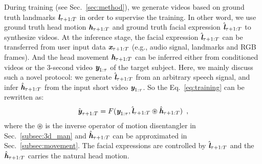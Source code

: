 \documentclass[runningheads]{llncs}
\def\mathbi#1{\textbf{\em #1}}
\begin{document}
During training (see Sec.~\ref{sec:method}), we generate videos based on ground truth landmarks $\mathbi{l}_{\tau+1:T}$ in order to supervise the training. In other word, we use ground truth head motion $\mathbi{h}_{\tau+1:T}$ and ground truth facial expression $\hat{\mathbi{l}}_{\tau+1:T}$ to synthesize videos. At the inference stage, the facial expression $\hat{\mathbi{l}}_{\tau+1:T}$ can be transferred from user input data ${\mathbi{x}}_{\tau+1:T}$ (e.g., audio signal, landmarks and RGB frames). And the head movement ${\mathbi{h}}_{\tau+1:T}$ can be inferred either from conditioned videos or the 3-second video ${\mathbi{y}}_{1:\tau}$ of the target subject. Here, we mainly discuss such a novel protocol: we generate $\hat{\mathbi{l}}_{\tau+1:T}$ from an arbitrary speech signal, and infer $\hat{\mathbi{h}}_{\tau+1:T}$  from the input short video ${\mathbi{y}}_{1:\tau}$. So the Eq.~\ref{eq:training} can be rewritten as:
\begin{equation}
\begin{aligned}
\hat{\mathbi{y}}_{ \tau+1:T} =  F( \mathbi{y}_{1:\tau},\hat{\mathbi{l}}_{\tau+1:T}   \circledast \hat{\mathbi{h}}_{\tau+1:T} )  \enspace,
\end{aligned}
\label{eq:inference}    
\end{equation}
where the $\circledast$ is the inverse operator of motion disentangler in Sec.~\ref{subsec:3d_man} and $\hat{\mathbi{h}}_{\tau+1:T}$ can be approximated in Sec.~\ref{subsec:movement}.
%
The facial expressions are controlled by $\hat{\mathbi{l}}_{\tau+1:T}$ and the $\hat{\mathbi{h}}_{\tau+1:T}$ carries the natural head motion. 
 
\end{document}
